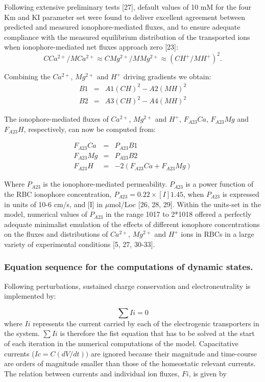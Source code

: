 \documentclass[a4paper]{article}
\newcommand{\med}[1]{M#1}
\newcommand{\cell}[1]{C#1}
\newcommand{\MCatp}{\med{Ca^{2+}}}
\newcommand{\MMgtp}{\med{Mg^{2+}}}
\newcommand{\MH}{\med{H}}
\newcommand{\CH}{\cell{H}}
\newcommand{\CMgtp}{\cell{Mg^{2+}}}
\newcommand{\CCatp}{\cell{Ca^{2+}}}
\newcommand{\F}[2]{F_{#1}#2}
\begin{document}
Following extensive preliminary tests [27], default values of 10 mM for the four Km and KI parameter set were found to deliver excellent agreement between predicted and measured ionophore-mediated fluxes, and to ensure adequate compliance with the measured equilibrium distribution of the transported ions when ionophore-mediated net fluxes approach zero [23]: 
\[\CCatp/\MCatp \approx \CMgtp/\MMgtp \approx (\CH^+/\MH^+)^2.\]

Combining the $Ca^{2+}$, $Mg^{2+}$ and $H^+$ driving gradients we obtain:
\begin{eqnarray}
\nonumber B1&=& A1(\CH)^2 - A2(\MH)^2 \\
\nonumber B2&=& A3(\CH)^2 - A4(\MH)^2
\end{eqnarray}

The ionophore-mediated fluxes of $Ca^{2+}$, $Mg^{2+}$ and $H^+$, $\F{A23}{Ca}$, $\F{A23}{Mg}$ and $\F{A23}{H}$, respectively, can now be computed from: 

\setcounter{equation}{0}
\renewcommand{\theequation}{A23-\arabic{equation}}

\begin{eqnarray}
\F{A23}{Ca} &=& P_{A23}B1 \\
\F{A23}{Mg} &=& P_{A23}B2 \\
\F{A23}{H} &=& -2(\F{A23}{Ca} + \F{A23}{Mg})
\end{eqnarray}

Where $P_{A23}$ is the ionophore-mediated permeability. $P_{A23}$ is a power function of the RBC ionophore concentration, $P_{A23} = 0.22\times [I]1.45$, when $P_{A23}$ is expressed in units of 10-6 cm/s, and [I] in $\mu$mol/Loc [26, 28, 29]. Within the units-set in the model, numerical values of $P_{A23}$ in the range 1017 to 2*1018 offered a perfectly adequate minimalist emulation of the effects of different ionophore concentrations on the fluxes and distributions of $Ca^{2+}$, $Mg^{2+}$ and $H^{+}$ ions in RBCs in a large variety of experimental conditions [5, 27, 30-33].    

\subsubsection{Equation sequence for the computations of dynamic states.}
Following perturbations, sustained charge conservation and electroneutrality is implemented by:

\setcounter{equation}{0}
\renewcommand{\theequation}{18\alph{equation}}

\begin{equation}
\sum Ii = 0 
\end{equation}
where $Ii$ represents the current carried by each of the electrogenic transporters in the system. $\sum Ii$ is therefore the fist equation that has to be solved at the start of each iteration in the numerical computations of the model. Capacitative currents ($Ic = C(dV/dt))$ are ignored because their magnitude and time-course are orders of magnitude smaller than those of the homeostatic relevant currents.  The relation between currents and individual ion fluxes, $Fi$, is given by 
\end{document}
